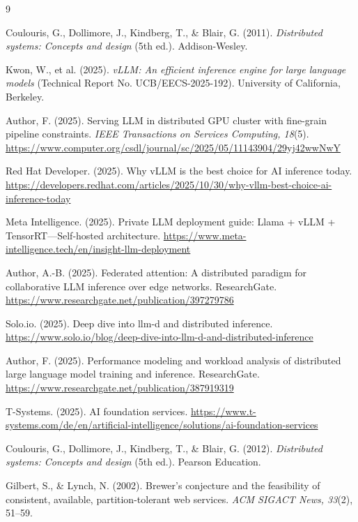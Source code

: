 \documentclass[runningheads]{llncs}
\begin{document}
\begin{thebibliography}{9}
	
	\bibitem{}
	Coulouris, G., Dollimore, J., Kindberg, T., \& Blair, G. (2011). \textit{Distributed systems: Concepts and design} (5th ed.). Addison-Wesley.
	
	\bibitem{}
	Kwon, W., et al. (2025). \textit{vLLM: An efficient inference engine for large language models} (Technical Report No. UCB/EECS-2025-192). University of California, Berkeley.
	
	\bibitem{}
	Author, F. (2025). Serving LLM in distributed GPU cluster with fine-grain pipeline constraints. \textit{IEEE Transactions on Services Computing, 18}(5). \href{https://www.computer.org/csdl/journal/sc/2025/05/11143904/29yj42wwNwY}{https://www.computer.org/csdl/journal/sc/2025/05/11143904/29yj42wwNwY}
	
	\bibitem{}
	Red Hat Developer. (2025). Why vLLM is the best choice for AI inference today. \href{https://developers.redhat.com/articles/2025/10/30/why-vllm-best-choice-ai-inference-today}{https://developers.redhat.com/articles/2025/10/30/why-vllm-best-choice-ai-inference-today}
	
	\bibitem{}
	Meta Intelligence. (2025). Private LLM deployment guide: Llama + vLLM + TensorRT—Self-hosted architecture. \href{https://www.meta-intelligence.tech/en/insight-llm-deployment}{https://www.meta-intelligence.tech/en/insight-llm-deployment}
	
	\bibitem{}
	Author, A.-B. (2025). Federated attention: A distributed paradigm for collaborative LLM inference over edge networks. ResearchGate. \href{https://www.researchgate.net/publication/397279786}{https://www.researchgate.net/publication/397279786}
	
	\bibitem{}
	Solo.io. (2025). Deep dive into llm-d and distributed inference. \href{https://www.solo.io/blog/deep-dive-into-llm-d-and-distributed-inference}{https://www.solo.io/blog/deep-dive-into-llm-d-and-distributed-inference}
	
	\bibitem{}
	Author, F. (2025). Performance modeling and workload analysis of distributed large language model training and inference. ResearchGate. \href{https://www.researchgate.net/publication/387919319}{https://www.researchgate.net/publication/387919319}
	
	\bibitem{}
	T-Systems. (2025). AI foundation services. \href{https://www.t-systems.com/de/en/artificial-intelligence/solutions/ai-foundation-services}{https://www.t-systems.com/de/en/artificial-intelligence/solutions/ai-foundation-services}
	
	\bibitem{}
	Coulouris, G., Dollimore, J., Kindberg, T., \& Blair, G. (2012). \textit{Distributed systems: Concepts and design} (5th ed.). Pearson Education.
	
	\bibitem{}
	Gilbert, S., \& Lynch, N. (2002). Brewer's conjecture and the feasibility of consistent, available, partition-tolerant web services. \textit{ACM SIGACT News, 33}(2), 51--59.
	
\end{thebibliography}
\end{document}
